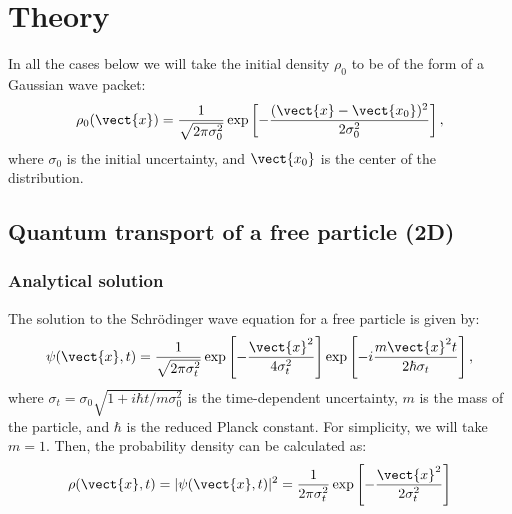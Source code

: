 \section{Theory} \label{section: theor}
In all the cases below we will take the initial density $\rho_0$ to be of the form of a Gaussian wave packet:
\begin{gather}
    \rho_0(\vect{x}) = \frac{1}{\sqrt{2\pi\sigma_0^2}}\exp\left[-\frac{(\vect{x}-\vect{x_0})^2}{2\sigma_0^2}\right],
\end{gather}
where $\sigma_0$ is the initial uncertainty, and $\vect{x_0}$ is the center of the distribution.

\subsection{Quantum transport of a free particle (2D)}
\subsubsection{Analytical solution}
The solution to the Schrödinger wave equation for a free particle \cite{Griffiths_2005} is given by:
\begin{gather}
    \psi(\vect{x}, t) = \frac{1}{\sqrt{2\pi\sigma_t^2}}\exp\left[-\frac{\vect{x}^2}{4\sigma_t^2}\right]\exp\left[-i \frac{m \vect{x}^2 t}{2\hbar \sigma_t}\right],
\end{gather}
where $\sigma_t = \sigma_0\sqrt{1 + i\hbar t/m\sigma_0^2}$ is the time-dependent uncertainty, $m$ is the mass of the particle, and $\hbar$ is the reduced Planck constant. For simplicity, we will take $m=1$.
Then, the probability density can be calculated as:
\begin{gather}
    \rho(\vect{x}, t) = |\psi(\vect{x}, t)|^2 = \frac{1}{2\pi\sigma_t^2}\exp\left[-\frac{\vect{x}^2}{2\sigma_t^2}\right] \label{eq: a anal}
\end{gather}

